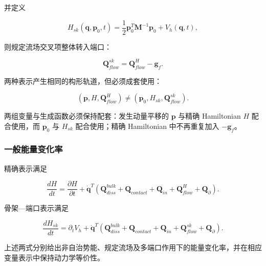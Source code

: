 并定义

\begin{equation}
\label{eq:hamiltonian-3-56}
H_{sk}\left( \mathbf{q},\mathbf{p}_{0},t \right) = \frac{1}{2}\mathbf{p}_{0}^{T}\mathbf{M}^{- 1}\mathbf{p}_{0} + V_{h}\left( \mathbf{q},t \right),
\end{equation}

则规定流场交叉项整体转入端口：

\begin{equation}
\label{eq:hamiltonian-3-57}
\boxed{\mathbf{Q}_{flow}^{sk} = \mathbf{Q}_{flow}^{H} - \mathbf{g}_{f}.}
\end{equation}

两种表示产生相同的构形轨道，但必须成套使用：

\begin{equation}
\label{eq:hamiltonian-3-58}
\boxed{\left( \mathbf{p},H,\mathbf{Q}_{flow}^{H} \right) \neq \left( \mathbf{p}_{0},H_{sk},\mathbf{Q}_{flow}^{sk} \right).}
\end{equation}

两组变量与生成函数必须保持配套：发生动量平移的 \(\mathbf{p}\) 与精确 Hamiltonian \(H\) 配合使用，而 \(\mathbf{p}_{0}\) 与 \(H_{sk}\) 配合使用；精确 Hamiltonian 中不再重复加入 \(- \mathbf{g}_{f}\)。

\subsubsection{一般能量变化率}\label{sec:hamiltonian-3-5-5}

精确表示满足

\begin{equation}
\label{eq:hamiltonian-3-59}
\boxed{\frac{dH}{dt} = \frac{\partial H}{\partial t} + {\dot{\mathbf{q}}}^{T}\left( \mathbf{Q}_{diss}^{bulk} + \mathbf{Q}_{contact} + \mathbf{Q}_{in} + \mathbf{Q}_{flow}^{H} + \mathbf{Q}_{\partial} \right).}
\end{equation}

骨架---端口表示满足

\begin{equation}
\label{eq:hamiltonian-3-60}
\boxed{\frac{dH_{sk}}{dt} = \partial_{t}V_{h} + {\dot{\mathbf{q}}}^{T}\left( \mathbf{Q}_{diss}^{bulk} + \mathbf{Q}_{contact} + \mathbf{Q}_{in} + \mathbf{Q}_{flow}^{sk} + \mathbf{Q}_{\partial} \right).}
\end{equation}

上述两式分别给出非自治势能、规定流场及多端口作用下的能量变化率，并在相应变量表示中保持动力学等价性。

